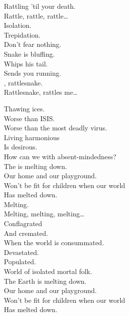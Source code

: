 Rattling 'til your death. \\

Rattle, rattle, rattle… \\

Isolation. \\
Trepidation. \\
Don't fear nothing. \\
Snake is bluffing. \\
Whips his tail. \\
Sends you running. \\

, rattlesnake. \\
Rattlesnake, rattles me… \\





Thawing ices. \\
Worse than ISIS. \\
Worse than the most deadly virus. \\
Living harmonious \\
Is desirous. \\
How can we with absent-mindedness? \\

The  is melting down. \\
Our home and our playground. \\
Won't be fit for children when our world \\
Has melted down. \\

Melting. \\
Melting, melting, melting… \\

Conflagrated \\
And cremated. \\
When the world is consummated. \\
Devastated. \\
Populated. \\
World of isolated mortal folk. \\

The Earth is melting down. \\
Our home and our playground. \\
Won't be fit for children when our world \\
Has melted down. \\

